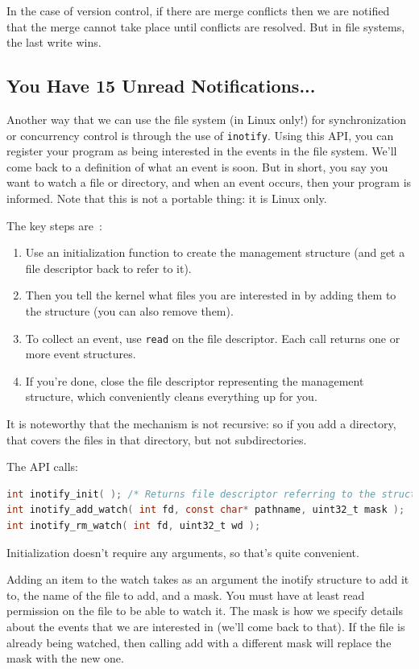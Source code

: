In the case of version control, if there are merge conflicts then we are notified that the merge cannot take place until conflicts are resolved. But in file systems, the last write wins.

\subsection*{You Have 15 Unread Notifications...}

Another way that we can use the file system (in Linux only!) for synchronization or concurrency control is through the use of \texttt{inotify}. Using this API, you can register your program as being interested in the events in the file system. We'll come back to a definition of what an event is soon. But in short, you say you want to watch a file or directory, and when an event occurs, then your program is informed. Note that this is not a portable thing: it is Linux only.

The key steps are~\cite{lpi}:
\begin{enumerate}
	\item Use an initialization function to create the management structure (and get a file descriptor back to refer to it).
	\item Then you tell the kernel what files you are interested in by adding them to the structure (you can also remove them).
	\item To collect an event, use \texttt{read} on the file descriptor. Each call returns one or more event structures.
	\item If you're done, close the file descriptor representing the management structure, which conveniently cleans everything up for you.
\end{enumerate}

It is noteworthy that the mechanism is not recursive: so if you add a directory, that covers the files in that directory, but not subdirectories.

The API calls:
\begin{lstlisting}[language=C]
int inotify_init( ); /* Returns file descriptor referring to the struct */
int inotify_add_watch( int fd, const char* pathname, uint32_t mask );
int inotify_rm_watch( int fd, uint32_t wd );
\end{lstlisting}

Initialization doesn't require any arguments, so that's quite convenient.

Adding an item to the watch takes as an argument the inotify structure to add it to, the name of the file to add, and a mask. You must have at least read permission on the file to be able to watch it. The mask is how we specify details about the events that we are interested in (we'll come back to that). If the file is already being watched, then calling add with a different mask will replace the mask with the new one.

